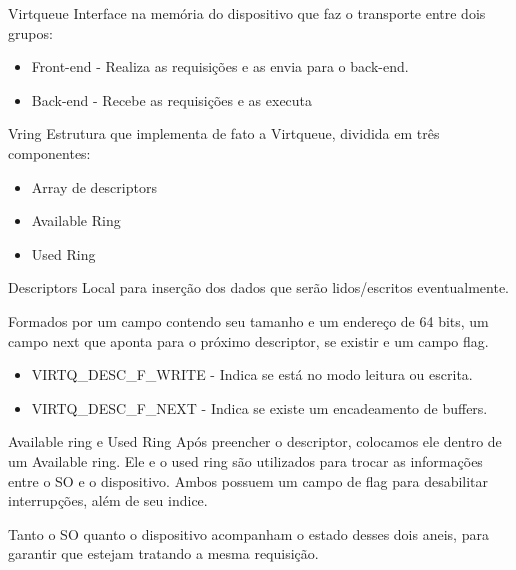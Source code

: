 \documentclass[brazil,nolapesd,aspectratio=169,noartschool]{lapesd-slides}
\begin{document}
\begin{frame}{Virtqueue}
	Interface na memória do dispositivo que faz o transporte entre dois grupos:

	\begin{itemize}
		\item Front-end - Realiza as requisições e as envia para o back-end.
		\item Back-end - Recebe as requisições e as executa
	\end{itemize}


\end{frame}

\begin{frame}{Vring}
	Estrutura que implementa de fato a Virtqueue, dividida em três componentes:

	\begin{itemize}
		\item Array de descriptors
		\item Available Ring
		\item Used Ring
	\end{itemize}
\end{frame}

\begin{frame}{Descriptors}
	Local para inserção dos dados que serão lidos/escritos eventualmente.

	\vspace{1em}

	Formados por um campo contendo seu tamanho e um endereço de 64 bits, um campo next que aponta
	para o próximo descriptor, se existir e um campo flag.

	\vspace{1em}

	\begin{itemize}
		\item VIRTQ{\_}DESC{\_}F{\_}WRITE - Indica se está no modo leitura ou escrita.
		\item VIRTQ{\_}DESC{\_}F{\_}NEXT - Indica se existe um encadeamento de buffers.
	\end{itemize}
\end{frame}

\begin{frame}{Available ring e Used Ring}
	Após preencher o descriptor, colocamos ele dentro de um Available ring. Ele e o used ring são
	utilizados para trocar as informações entre o SO e o dispositivo. Ambos possuem um campo de
	flag para desabilitar interrupções, além de seu indice.

	\vspace{1em}

	Tanto o SO quanto o dispositivo acompanham o estado desses dois aneis, para garantir que estejam
	tratando a mesma requisição.
\end{frame}
\end{document}
